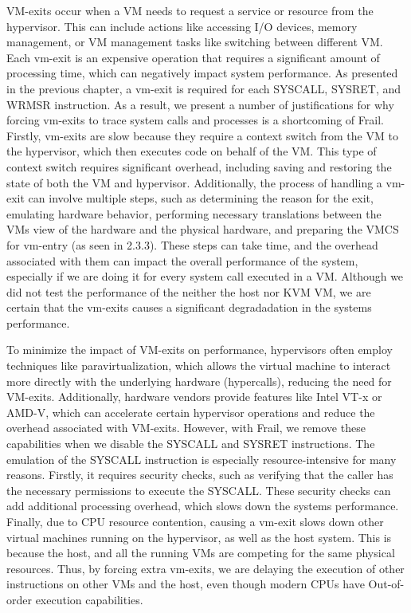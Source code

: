 \documentclass{report}
\begin{document}
\begin{spacing}{1.5}
{\large
VM-exits occur when a VM needs to request a service or resource from the hypervisor. This can include actions like accessing I/O devices, memory management, or VM management tasks like switching between different VM. Each vm-exit is an expensive operation that requires a significant amount of processing time, which can negatively impact system performance. As presented in the previous chapter, a vm-exit is required for each SYSCALL, SYSRET, and WRMSR instruction. As a result, we present a number of justifications for why forcing vm-exits to trace system calls and processes is a shortcoming of Frail. Firstly, vm-exits are slow because they require a context switch from the VM to the hypervisor, which then executes code on behalf of the VM. This type of context switch requires significant overhead, including saving and restoring the state of both the VM and hypervisor. Additionally, the process of handling a vm-exit can involve multiple steps, such as determining the reason for the exit, emulating hardware behavior, performing necessary translations between the VMs view of the hardware and the physical hardware, and preparing the VMCS for vm-entry (as seen in 2.3.3). These steps can take time, and the overhead associated with them can impact the overall performance of the system, especially if we are doing it for every system call executed in a VM. Although we did not test the performance of the neither the host nor KVM VM, we are certain that the vm-exits causes a significant degradadation in the systems performance.  


To minimize the impact of VM-exits on performance, hypervisors often employ techniques like paravirtualization, which allows the virtual machine to interact more directly with the underlying hardware (hypercalls), reducing the need for VM-exits. Additionally, hardware vendors provide features like Intel VT-x or AMD-V, which can accelerate certain hypervisor operations and reduce the overhead associated with VM-exits. However, with Frail, we remove these capabilities when we disable the SYSCALL and SYSRET instructions. The emulation of the SYSCALL instruction is especially resource-intensive for many reasons. Firstly, it requires security checks, such as verifying that the caller has the necessary permissions to execute the SYSCALL. These security checks can add additional processing overhead, which slows down the systems performance. Finally, due to CPU resource contention, causing a vm-exit slows down other virtual machines running on the hypervisor, as well as the host system. This is because the host, and all the running VMs are competing for the same physical resources. Thus, by forcing extra vm-exits, we are delaying the execution of other instructions on other VMs and the host, even though modern CPUs have Out-of-order execution capabilities.
\newline
}


\end{spacing}
\end{document}

